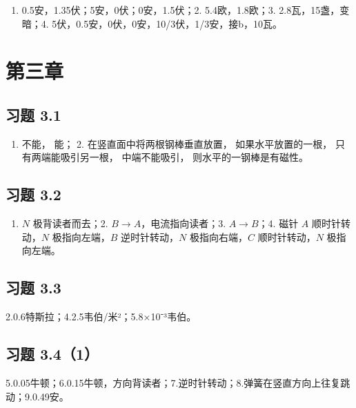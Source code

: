 \begin{enumerate}
\def\labelenumi{\arabic{enumi}.}
\tightlist
\item
  0.5安，1.35伏；5安，0伏；0安，1.5伏；2. 5.4欧，1.8欧；3.
  2.8瓦，15盏，变暗；4. 5伏，0.5安，0伏，0安，10/3伏，1/3安，接b，10瓦。
\end{enumerate}

\section{第三章}\label{ux7b2cux4e09ux7ae0}

\subsection{习题 3.1}\label{ux4e60ux9898-3.1-1}

\begin{enumerate}
\def\labelenumi{\arabic{enumi}.}
\tightlist
\item
  不能， 能； 2. 在竖直面中将两根钢棒垂直放置， 如果水平放置的一根，
  只有两端能吸引另一根， 中端不能吸引， 则水平的一钢棒是有磁性。
\end{enumerate}

\subsection{习题 3.2}\label{ux4e60ux9898-3.2-1}

\begin{enumerate}
\def\labelenumi{\arabic{enumi}.}
\tightlist
\item
  \(N\) 极背读者而去；2. \(B \rightarrow A\)，电流指向读者；3.
  \(A \rightarrow B\)；4. 磁针 \(A\) 顺时针转动，\(N\) 极指向左端，\(B\)
  逆时针转动，\(N\) 极指向右端，\(C\) 顺时针转动，\(N\) 极指向左端。
\end{enumerate}

\subsection{习题 3.3}\label{ux4e60ux9898-3.3-1}

2.0.6特斯拉；4.2.5韦伯/米²；5.8×10⁻³韦伯。

\subsection{习题 3.4（1）}\label{ux4e60ux9898-3.41-1}

5.0.05牛顿；6.0.15牛顿，方向背读者；7.逆时针转动；8.弹簧在竖直方向上往复跳动；9.0.49安。


